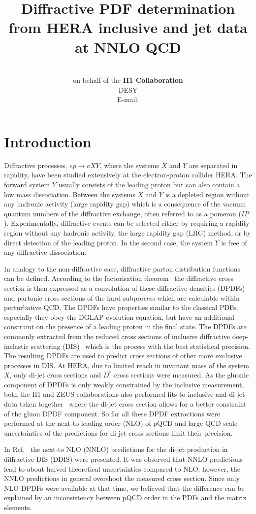 \documentclass{PoS}
\title{Diffractive PDF determination from HERA inclusive and jet data at NNLO QCD}
\author{\speaker{Radek \v{Z}leb\v{c}\'{i}k}\\ on behalf of the \textup{\textbf{H1 Collaboration}} \\
        DESY\\
        E-mail: \email{radek.zlebcik@desy.de}}
\newcommand{\IP}{I\!\!P}
\begin{document}
\section{Introduction}

Diffractive processes, $ep \to  eXY$, where the systems $X$ and $Y$ are separated in rapidity, have been studied extensively at the electron-proton collider HERA.
The forward system $Y$ usually consists of the leading proton but can also contain a low mass dissociation.
Between the systems $X$ and $Y$ is a depleted region without any hadronic activity (large rapidity gap) which is a consequence of the vacuum quantum numbers of the diffractive exchange, often referred to as a pomeron ($\IP$).
Experimentally, diffractive events can be selected either by requiring a rapidity region without any hadronic activity, the large rapidity gap (LRG) method, or by direct detection of the leading proton.
In the second case, the system $Y$ is free of any diffractive dissociation.

In analogy to the non-diffractive case, diffractive parton distribution functions can be defined.
According to the factorisation theorem~\cite{Collins:1997sr} the diffractive cross section is then expressed as a convolution of these diffractive densities (DPDFs) and partonic cross sections of the hard subprocess which are calculable within perturbative QCD.
The DPDFs have properties similar to the classical PDFs, especially they obey the DGLAP evolution equation, but have an additional constraint on the presence of a leading proton in the final state.
The DPDFs are commonly extracted from the reduced cross sections of inclusive diffractive deep-inelastic scattering (DIS)~\cite{Aktas:2006hy} which is the process with the best statistical precision.
The resulting DPDFs are used to predict cross sections of other more exclusive processes in DIS.
At HERA, due to limited reach in invariant mass of the system $X$, only di-jet cross sections and $D^{*}$ cross sections were measured.
As the gluonic component of DPDFs is only weakly constrained by the inclusive measurement, both the H1 and ZEUS collaborations also performed fits to inclusive and di-jet data taken together~\cite{Aktas:2007bv,Chekanov:2009aa} where the di-jet cross section allows for a better constraint of the gluon DPDF component.
So far all these DPDF extractions were performed at the next-to leading order (NLO)  of pQCD and large QCD scale uncertainties of the predictions for di-jet cross sections limit their precision.

In Ref.~\cite{Britzger:2018zvv} the next-to NLO (NNLO) predictions for the di-jet production in diffractive DIS (DDIS) were presented.
It was observed that NNLO predictions lead to about halved theoretical uncertainties compared to NLO, however, the NNLO predictions in general overshoot the measured cross section.
Since only NLO DPDFs were available at that time, we believed that the difference can be explained by an inconsistency between pQCD order in the PDFs and the matrix elements.
\end{document}
